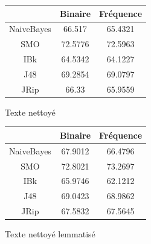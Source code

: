 \documentclass[a4paper, 11pt]{article}
\begin{document}
\begin{figure}[h]
\begin{minipage}{0.5\textwidth}
\begin{tabular}{|c|c|c|}
\hline
 & Binaire & Fréquence \\
 \hline
 NaiveBayes & 66.517 & 65.4321 \\
 \hline
 SMO & 72.5776 & 72.5963 \\
 \hline
 IBk & 64.5342 & 64.1227 \\
 \hline
 J48 & 69.2854 & 69.0797 \\
 \hline
 JRip & 66.33 & 65.9559 \\
 \hline
\end{tabular}
\caption{Texte nettoyé}
\end{minipage}
\begin{minipage}{0.5\textwidth}
\begin{tabular}{|c|c|c|}
\hline
 & Binaire & Fréquence \\
 \hline
 NaiveBayes & 67.9012 & 66.4796 \\
 \hline
 SMO & 72.8021 & 73.2697 \\
 \hline
 IBk & 65.9746 & 62.1212 \\
 \hline
 J48 & 69.0423 & 68.9862 \\
 \hline
 JRip & 67.5832 & 67.5645 \\
 \hline
\end{tabular}
\caption{Texte nettoyé lemmatisé}
\end{minipage}
\end{figure}
\end{document}
